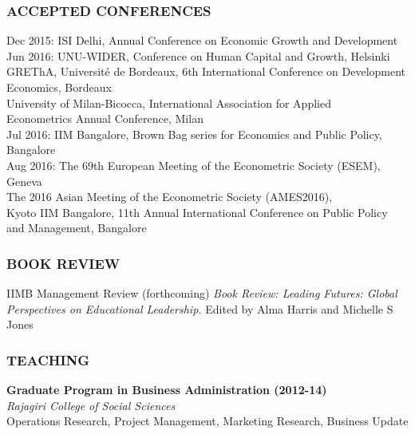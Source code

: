 \documentclass[12pt, a4paper]{article}
\begin{document}
	\subsubsection*{ACCEPTED CONFERENCES} 
Dec 2015: \tabto{5em} ISI Delhi, Annual Conference on Economic Growth and Development \\
Jun 2016: \tabto{5em} UNU-WIDER, Conference on Human Capital and Growth, Helsinki \\
\tabto{5em} GREThA, Universit\'{e} de Bordeaux, 6th International Conference on \tabto{5em} Development Economics, Bordeaux \\	
\tabto{5em} University of Milan-Bicocca, International Association for Applied \\ \tabto{5em} Econometrics Annual Conference, Milan \\
Jul 2016: \tabto{5em} IIM Bangalore, Brown Bag series for Economics and Public Policy, \\
\tabto{5em} Bangalore \\
Aug 2016: \tabto{5em} The 69th European Meeting of the Econometric Society (ESEM), Geneva \\
\tabto{5em} The 2016 Asian Meeting of the Econometric Society (AMES2016),\\ 
\tabto{5em} Kyoto
\tabto{5em} IIM Bangalore, 11th Annual International Conference on Public Policy \tabto{5em} and Management, Bangalore

	\subsubsection*{BOOK REVIEW}
	
	IIMB Management Review (forthcoming) \textit{Book Review: Leading Futures: Global Perspectives on Educational Leadership.} Edited by Alma Harris and Michelle S Jones
	
	\subsubsection*{TEACHING}
	\noindent\textbf{Graduate Program in Business Administration (2012-14)} \\
	\noindent\textit{Rajagiri College of Social Sciences} \\
	Operations Research, Project Management, Marketing Research, Business Update 
\end{document}

